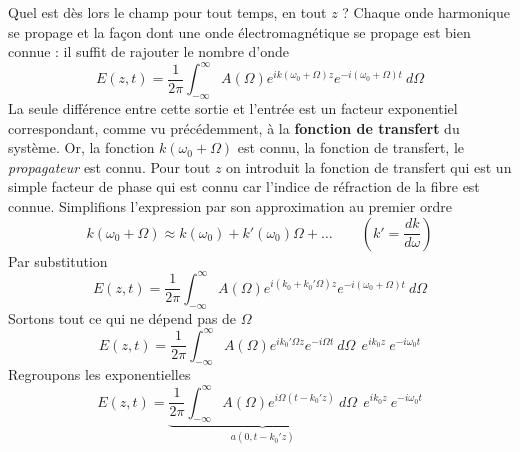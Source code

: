 Quel est dès lors le champ pour tout temps, en tout $z$ ? Chaque onde harmonique se propage et 
la façon dont une onde électromagnétique se propage est bien connue : il suffit de rajouter le 
nombre d'onde 
\begin{equation}
E(z,t) =\dfrac{1}{2\pi}\int_{-\infty}^\infty A(\Omega)e^{ik(\omega_0+\Omega)z}e^{-i(\omega_0+\Omega)t}
\ d\Omega
\end{equation}
La seule différence entre cette sortie et l'entrée est un facteur exponentiel correspondant, 
comme vu précédemment, à la \textbf{fonction de transfert} du système. Or, la fonction $k(
\omega_0+\Omega)$ est connu, la fonction de transfert, le \textit{propagateur} est connu. Pour 
tout $z$ on introduit la fonction de transfert qui est un simple facteur de phase qui est connu 
car l'indice de réfraction de la fibre est connue. Simplifions l'expression par son approximation 
au premier ordre
\begin{equation}
k(\omega_0+\Omega) \approx k(\omega_0)+k'(\omega_0)\Omega+\dots\qquad \left(k'=\dfrac{dk}{d\omega}
\right)
\end{equation}
Par substitution
\begin{equation}
E(z,t) =\dfrac{1}{2\pi}\int_{-\infty}^\infty  A(\Omega)e^{i(k_0+k_0'\Omega)z}e^{-i(\omega_0+
\Omega)t}
\ d\Omega
\end{equation}
Sortons tout ce qui ne dépend pas de $\Omega$
\begin{equation}
E(z,t) =\dfrac{1}{2\pi}\int_{-\infty}^\infty  A(\Omega)e^{ik_0'\Omega z}e^{-i\Omega t}\ d\Omega\ \ 
e^{ik_0 z}\ e^{-i\omega_0 t}
\end{equation}
Regroupons les exponentielles
\begin{equation}
E(z,t) =\underbrace{\dfrac{1}{2\pi}\int_{-\infty}^\infty  A(\Omega)e^{i\Omega(t-k_0'z)}\ d\Omega}_{
a(0,t-k_0'z)}\ \ 
e^{ik_0 z}\ e^{-i\omega_0 t}
\end{equation}

